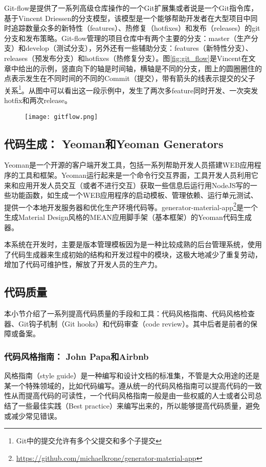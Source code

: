 Git-flow是提供了一系列高级仓库操作的一个Git扩展集或者说是一个Git指令库，基于Vincent Driessen的分支模型\supercite{driessen2010successful}，该模型是一个能够帮助开发者在大型项目中同时追踪数量众多的新特性（features）、热修复（hotfixes）和发布（releases）的git分支和发布策略。Git-flow管理的项目仓库中有两个主要的分支：master（生产分支）和develop（测试分支），另外还有一些辅助分支：features（新特性分支）、releases（预发布分支）和hotfixes（热修复分支）。图\ref{fig:git_flow}是Vincent在文章中给出的示例，竖直向下的轴是时间轴，横轴是不同的分支，图上的圆圈圈住的点表示发生在不同时间的不同的Commit（提交），带有箭头的线表示提交的父子关系\footnote{Git中的提交允许有多个父提交和多个子提交}。从图中可以看出这一段示例中，发生了两次多feature同时开发、一次突发hotfix和两次release。

\begin{figure}[!htp]
 \centering
 \texttt{[image: gitflow.png]}
\end{figure}

\subsection{代码生成： Yeoman和Yeoman Generators}
Yeoman是一个开源的客户端开发工具，包括一系列帮助开发人员搭建WEB应用程序的工具和框架。Yeoman运行起来是一个命令行交互界面，工具开发人员利用它来和应用开发人员交互（或者不进行交互）获取一些信息后运行用NodeJS写的一些功能函数，如生成一个WEB应用程序的启动模板、管理依赖、运行单元测试、提供一个本地开发服务器和优化生产环境代码等。generator-material-app\footnote{\url{https://github.com/michaelkrone/generator-material-app}}是一个生成Material Design风格的MEAN应用脚手架（基本框架）的Yeoman代码生成器。

本系统在开发时，主要是版本管理模板因为是一种比较成熟的后台管理系统，使用了代码生成器来生成初始的结构和开发过程中的模块，这极大地减少了重复劳动，增加了代码可维护性，解放了开发人员的生产力。

\subsection{代码质量}
本小节介绍了一系列提高代码质量的手段和工具：代码风格指南、代码风格检查器、Git钩子机制（Git hooks）和代码审查（code review）。其中后者是前者的保障或备案。
\subsubsection{代码风格指南： John Papa和Airbnb}
风格指南（style guide）是一种编写和设计文档的标准集，不管是大众用途的还是某一个特殊领域的，比如代码编写。遵从统一的代码风格指南可以提高代码的一致性从而提高代码的可读性，一个代码风格指南一般是由一些权威的人士或者公司总结了一些最佳实践（Best practice）来编写出来的，所以能够提高代码质量，避免或减少常见错误。

